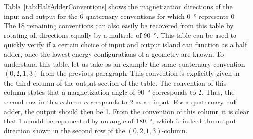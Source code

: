 \documentclass[11pt,a4paper,english]{article}
\begin{document}
Table~\ref{tab:HalfAdderConventions} shows the magnetization directions of the input and output for the 6 quaternary conventions for which \SI{0}{\degree} represents 0. The 18 remaining conventions can also easily be recovered from this table by rotating all directions equally by a multiple of \SI{90}{\degree}. This table can be used to quickly verify if a certain choice of input and output island can function as a half adder, once the lowest energy configurations of a geometry are known. To understand this table, let us take as an example the same quaternary convention $(0, 2, 1, 3)$ from the previous paragraph. This convention is explicitly given in the third column of the output section of the table. The convention of this column states that a magnetization angle of \SI{90}{\degree} corresponds to 2. Thus, the second row in this column corresponds to 2 as an input. For a quaternary half adder, the output should then be 1. From the convention of this column it is clear that 1 should be represented by an angle of \SI{180}{\degree}, which is indeed the output direction shown in the second row of the $(0, 2, 1, 3)$-column.
\end{document}

